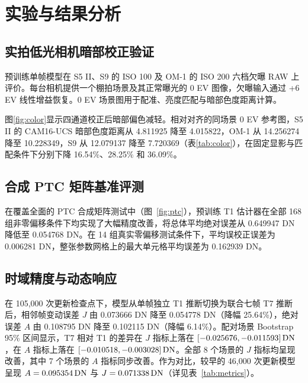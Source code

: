 
\section{实验与结果分析}
\label{sec:results}

\subsection{实拍低光相机暗部校正验证}
预训练单帧模型在 S5 II、S9 的 ISO 100 及 OM-1 的 ISO 200 六档欠曝 RAW 上评价。每台相机提供一个棚拍场景及其正常曝光的 0 EV 图像，欠曝输入通过 +6 EV 线性增益恢复。0 EV 场景图用于配准、亮度匹配与暗部色度距离计算。

图\ref{fig:color}显示四通道校正后暗部偏色减轻。相对对齐的同场景 0 EV 参考图，S5 II 的 CAM16-UCS 暗部色度距离从 4.811925 降至 4.015822，OM-1 从 14.256274 降至 10.228349，S9 从 12.079137 降至 7.720369（表\ref{tab:color}），在固定显影与匹配条件下分别下降 16.54\%、28.25\% 和 36.09\%。



\subsection{合成 PTC 矩阵基准评测}
在覆盖全面的 PTC 合成矩阵测试中（图~\ref{fig:ptc}），预训练 T1 估计器在全部 168 组非零偏移条件下均实现了大幅精度改善，将总体平均绝对误差从 0.649947 DN 降低至 0.054768 DN。在 14 组真实零偏移测试条件下，平均误校正误差为 0.006281 DN，整张参数网格上的最大单元格平均误差为 0.162939 DN。


\subsection{时域精度与动态响应}


在 105,000 次更新检查点下，模型从单帧独立 T1 推断切换为联合七帧 T7 推断后，相邻帧变动误差 $J$ 由 0.073666 DN 降至 0.054778 DN（降幅 25.64\%），绝对误差 $A$ 由 0.108795 DN 降至 0.102115 DN（降幅 6.14\%）。配对场景 Bootstrap 95\% 区间显示，T7 相对 T1 的差异在 $J$ 指标上落在 $[-0.025676,-0.011593]\,\mathrm{DN}$，在 $A$ 指标上落在 $[-0.010518,-0.003028]\,\mathrm{DN}$。全部 8 个场景的 $J$ 指标均呈现改善，其中 7 个场景的 $A$ 指标同步改善。作为对比，较早的 46,000 次更新模型呈现 $A=0.095354\,\mathrm{DN}$ 与 $J=0.071338\,\mathrm{DN}$（详见表~\ref{tab:metrics}）。

